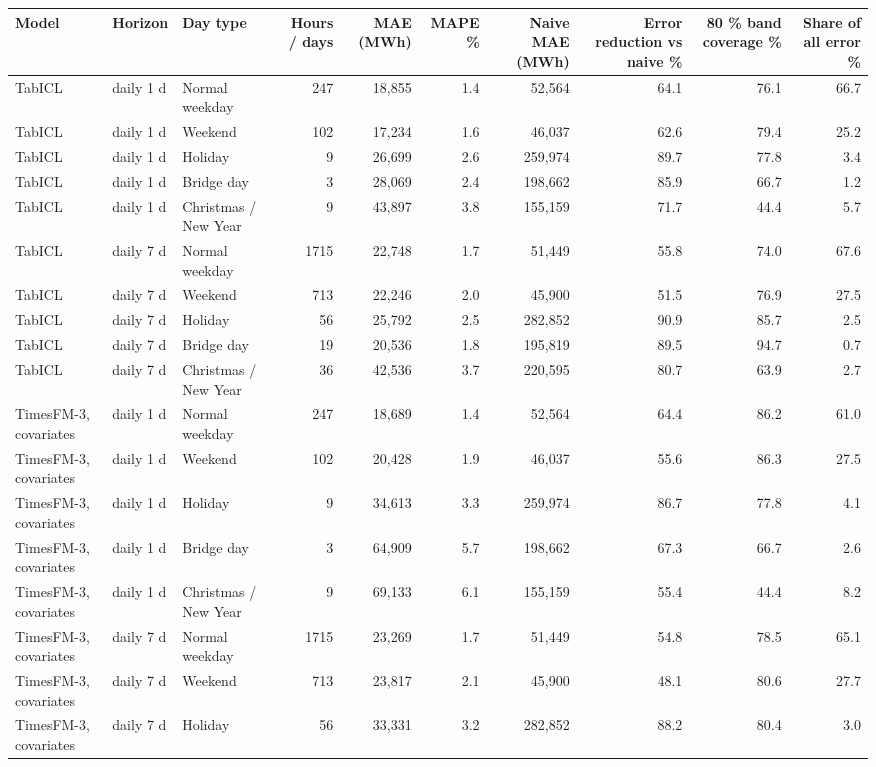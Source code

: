 \begin{tabular}{lllrrrrrrr}
\toprule
Model & Horizon & Day type & Hours / days & MAE (MWh) & MAPE \% & Naive MAE (MWh) & Error reduction vs naive \% & 80 \% band coverage \% & Share of all error \% \\
\midrule
TabICL & daily 1 d & Normal weekday & 247 & 18,855 & 1.4 & 52,564 & 64.1 & 76.1 & 66.7 \\
TabICL & daily 1 d & Weekend & 102 & 17,234 & 1.6 & 46,037 & 62.6 & 79.4 & 25.2 \\
TabICL & daily 1 d & Holiday & 9 & 26,699 & 2.6 & 259,974 & 89.7 & 77.8 & 3.4 \\
TabICL & daily 1 d & Bridge day & 3 & 28,069 & 2.4 & 198,662 & 85.9 & 66.7 & 1.2 \\
TabICL & daily 1 d & Christmas / New Year & 9 & 43,897 & 3.8 & 155,159 & 71.7 & 44.4 & 5.7 \\
TabICL & daily 7 d & Normal weekday & 1715 & 22,748 & 1.7 & 51,449 & 55.8 & 74.0 & 67.6 \\
TabICL & daily 7 d & Weekend & 713 & 22,246 & 2.0 & 45,900 & 51.5 & 76.9 & 27.5 \\
TabICL & daily 7 d & Holiday & 56 & 25,792 & 2.5 & 282,852 & 90.9 & 85.7 & 2.5 \\
TabICL & daily 7 d & Bridge day & 19 & 20,536 & 1.8 & 195,819 & 89.5 & 94.7 & 0.7 \\
TabICL & daily 7 d & Christmas / New Year & 36 & 42,536 & 3.7 & 220,595 & 80.7 & 63.9 & 2.7 \\
TimesFM-3, covariates & daily 1 d & Normal weekday & 247 & 18,689 & 1.4 & 52,564 & 64.4 & 86.2 & 61.0 \\
TimesFM-3, covariates & daily 1 d & Weekend & 102 & 20,428 & 1.9 & 46,037 & 55.6 & 86.3 & 27.5 \\
TimesFM-3, covariates & daily 1 d & Holiday & 9 & 34,613 & 3.3 & 259,974 & 86.7 & 77.8 & 4.1 \\
TimesFM-3, covariates & daily 1 d & Bridge day & 3 & 64,909 & 5.7 & 198,662 & 67.3 & 66.7 & 2.6 \\
TimesFM-3, covariates & daily 1 d & Christmas / New Year & 9 & 69,133 & 6.1 & 155,159 & 55.4 & 44.4 & 8.2 \\
TimesFM-3, covariates & daily 7 d & Normal weekday & 1715 & 23,269 & 1.7 & 51,449 & 54.8 & 78.5 & 65.1 \\
TimesFM-3, covariates & daily 7 d & Weekend & 713 & 23,817 & 2.1 & 45,900 & 48.1 & 80.6 & 27.7 \\
TimesFM-3, covariates & daily 7 d & Holiday & 56 & 33,331 & 3.2 & 282,852 & 88.2 & 80.4 & 3.0 \\

\end{tabular}
